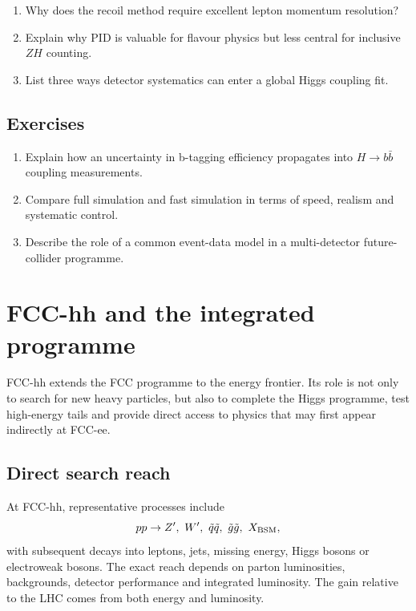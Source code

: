 \documentclass[11pt,a4paper]{article}
\numberwithin{equation}{section}
\begin{document}
\begin{guidedchecksbox}
\begin{enumerate}[leftmargin=1.6em]
\item Why does the recoil method require excellent lepton momentum resolution?
\item Explain why PID is valuable for flavour physics but less central for inclusive \(ZH\) counting.
\item List three ways detector systematics can enter a global Higgs coupling fit.
\end{enumerate}
\end{guidedchecksbox}

\subsection{Exercises}
\begin{enumerate}[leftmargin=1.6em]
\item Explain how an uncertainty in b-tagging efficiency propagates into \(H\to b\bar b\) coupling measurements.
\item Compare full simulation and fast simulation in terms of speed, realism and systematic control.
\item Describe the role of a common event-data model in a multi-detector future-collider programme.
\end{enumerate}


\newpage
\section{FCC-hh and the integrated programme}
\begin{guidelinebox}
FCC-hh extends the FCC programme to the energy frontier. Its role is not only to search for new heavy particles, but also to complete the Higgs programme, test high-energy tails and provide direct access to physics that may first appear indirectly at FCC-ee.
\end{guidelinebox}

\subsection{Direct search reach}
At FCC-hh, representative processes include
\begin{equation}
  pp\to Z',\ W',\ \tilde q\tilde q,\ \tilde g\tilde g,\ X_{\rm BSM},
\end{equation}
with subsequent decays into leptons, jets, missing energy, Higgs bosons or electroweak bosons. The exact reach depends on parton luminosities, backgrounds, detector performance and integrated luminosity. The gain relative to the LHC comes from both energy and luminosity.
\end{document}
